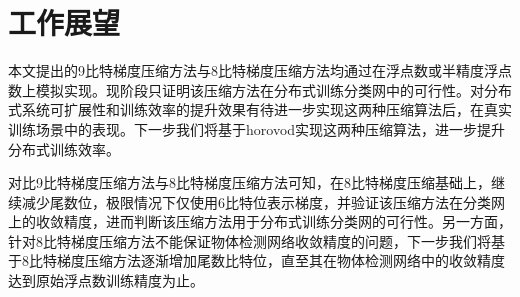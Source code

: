 \section{工作展望}
本文提出的9比特梯度压缩方法与8比特梯度压缩方法均通过在浮点数或半精度浮点数上模拟实现。现阶段只证明该压缩方法在分布式训练分类网中的可行性。对分布式系统可扩展性和训练效率的提升效果有待进一步实现这两种压缩算法后，在真实训练场景中的表现。下一步我们将基于horovod实现这两种压缩算法，进一步提升分布式训练效率。

对比9比特梯度压缩方法与8比特梯度压缩方法可知，在8比特梯度压缩基础上，继续减少尾数位，极限情况下仅使用6比特位表示梯度，并验证该压缩方法在分类网上的收敛精度，进而判断该压缩方法用于分布式训练分类网的可行性。另一方面，针对8比特梯度压缩方法不能保证物体检测网络收敛精度的问题，下一步我们将基于8比特梯度压缩方法逐渐增加尾数比特位，直至其在物体检测网络中的收敛精度达到原始浮点数训练精度为止。